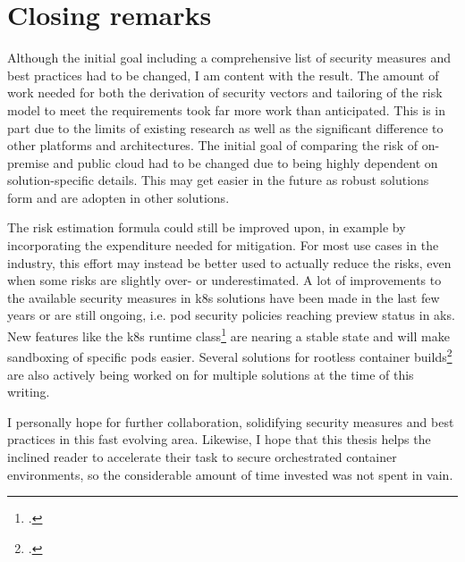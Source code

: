 \newpage
\section{Closing remarks}

Although the initial goal including a comprehensive list of security measures and best practices had to be changed, I am content with the result. The amount of work needed for both the derivation of security vectors and tailoring of the risk model to meet the requirements took far more work than anticipated. This is in part due to the limits of existing research as well as the significant difference to other platforms and architectures. The initial goal of comparing the risk of on-premise and public cloud had to be changed due to being highly dependent on solution-specific details. This may get easier in the future as robust solutions form and are adopten in other solutions.

The risk estimation formula could still be improved upon, in example by incorporating the expenditure needed for mitigation. For most use cases in the industry, this effort may instead be better used to actually reduce the risks, even when some risks are slightly over- or underestimated. 
A lot of improvements to the available security measures in \gls{k8s} solutions have been made in the last few years or are still ongoing, i.e. pod security policies reaching preview status in \gls{aks}. New features like the \gls{k8s} runtime class\footcite[][, section 'Motivation']{runtimeClass} are nearing a stable state and will make sandboxing of specific pods easier. Several solutions for rootless container builds\footcite[][, slides 10 to 11]{rootlessBuilds} are also actively being worked on for multiple solutions at the time of this writing. 

I personally hope for further collaboration, solidifying security measures and best practices in this fast evolving area.
Likewise, I hope that this thesis helps the inclined reader to accelerate their task to secure orchestrated container environments, so the considerable amount of time invested was not spent in vain.
